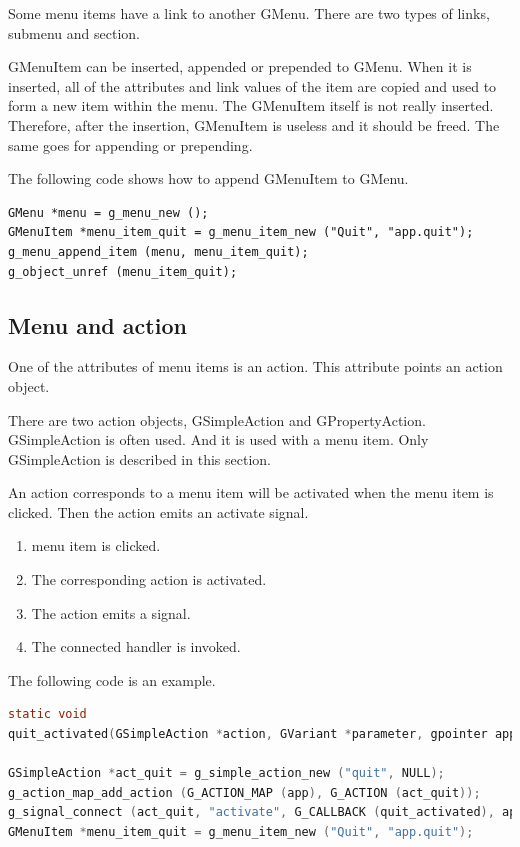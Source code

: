 Some menu items have a link to another GMenu. There are two types of
links, submenu and section.

GMenuItem can be inserted, appended or prepended to GMenu. When it is
inserted, all of the attributes and link values of the item are copied
and used to form a new item within the menu. The GMenuItem itself is not
really inserted. Therefore, after the insertion, GMenuItem is useless
and it should be freed. The same goes for appending or prepending.

The following code shows how to append GMenuItem to GMenu.

\begin{lstlisting}
GMenu *menu = g_menu_new ();
GMenuItem *menu_item_quit = g_menu_item_new ("Quit", "app.quit");
g_menu_append_item (menu, menu_item_quit);
g_object_unref (menu_item_quit);
\end{lstlisting}

\hypertarget{menu-and-action-1}{%
\subsection{Menu and action}\label{menu-and-action-1}}

One of the attributes of menu items is an action. This attribute points
an action object.

There are two action objects, GSimpleAction and GPropertyAction.
GSimpleAction is often used. And it is used with a menu item. Only
GSimpleAction is described in this section.

An action corresponds to a menu item will be activated when the menu
item is clicked. Then the action emits an activate signal.

\begin{enumerate}
\def\labelenumi{\arabic{enumi}.}
\tightlist
\item
  menu item is clicked.
\item
  The corresponding action is activated.
\item
  The action emits a signal.
\item
  The connected handler is invoked.
\end{enumerate}

The following code is an example.

\begin{lstlisting}[language=C]
static void
quit_activated(GSimpleAction *action, GVariant *parameter, gpointer app) { ... ... ...}

GSimpleAction *act_quit = g_simple_action_new ("quit", NULL);
g_action_map_add_action (G_ACTION_MAP (app), G_ACTION (act_quit));
g_signal_connect (act_quit, "activate", G_CALLBACK (quit_activated), app);
GMenuItem *menu_item_quit = g_menu_item_new ("Quit", "app.quit");
\end{lstlisting}

